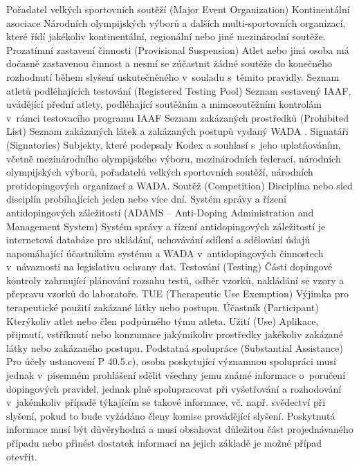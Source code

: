 \dend
\dt Pořadatel velkých sportovních soutěží (Major Event Organization)
\dd Kontinentální asociace Národních olympijských výborů a dalších multi-sportovních organizací, které řídí jakékoliv kontinentální, regionální nebo jiné mezinárodní soutěže.
\dend
\dt Prozatímní zastavení činnosti (Provisional Suspension)
\dd Atlet nebo jiná osoba má dočasně zastavenou činnost a nesmí se zúčastnit žádné soutěže do konečného rozhodnutí během slyšení uskutečněného v~souladu s~těmito pravidly.
\dend
\dt Seznam atletů podléhajících testování (Registered Testing Pool)
\dd Seznam sestavený IAAF, uvádějící přední atlety, podléhající soutěžním a mimosoutěžním kontrolám v~rámci testovacího programu IAAF
\dend
\dt Seznam zakázaných prostředků (Prohibited List)
\dd Seznam zakázaných látek a zakázaných postupů vydaný WADA .
\dend
\dt Signatáři (Signatories)
\dd Subjekty, které podepsaly Kodex a souhlasí s~jeho uplatňováním, včetně mezinárodního olympijského výboru, mezinárodních federací, národních olympijských výborů, pořadatelů velkých sportovních soutěží, národních protidopingových organizací a WADA.
\dend
\dt Soutěž (Competition)
\dd Disciplína nebo sled disciplín probíhajících jeden nebo více dní.
\dend
\dt Systém správy a řízení antidopingových záležitostí (ADAMS -- Anti-Doping Administration and Management System)
\dd Systém správy a řízení antidopingových záležitostí je internetová databáze pro ukládání, uchovávání sdílení a sdělování údajů napomáhající účastníkům systému a WADA v~antidopingových činnostech v~návaznosti na legislativu ochrany dat.
\dend
\dt Testování (Testing)
\dd Části dopingové kontroly zahrnující plánování rozsahu testů, odběr vzorků, nakládání se vzory a přepravu vzorků do laboratoře.
\dend
\dt TUE (Therapeutic Use Exemption)
\dd Výjimka pro terapeutické použití zakázané látky nebo postupu.
\dend
\dt Účastník (Participant)
\dd Kterýkoliv atlet nebo člen podpůrného týmu atleta.
\dend
\dt Užití (Use)
\dd Aplikace, přijmutí, vstříknutí nebo konzumace jakýmikoliv prostředky jakékoliv zakázané látky nebo zakázaného postupu.
\dend
\dt Podstatná spolupráce (Substantial Assistance)
\dd Pro účely ustanovení P 40.5.c), osoba poskytující významnou spolupráci musí jednak v~písemném prohlášení sdělit všechny jemu známé informace o~poručení dopingových pravidel, jednak plně spolupracovat při vyšetřování a rozhodování v~jakémkoliv případě týkajícím se takové informace, vč. např. svědectví při slyšení, pokud to bude vyžádáno členy komise provádějící slyšení. Poskytnutá informace musí být důvěryhodná a musí obsahovat důležitou část projednávaného případu nebo přinést dostatek informací na jejich základě je možné případ otevřít.
